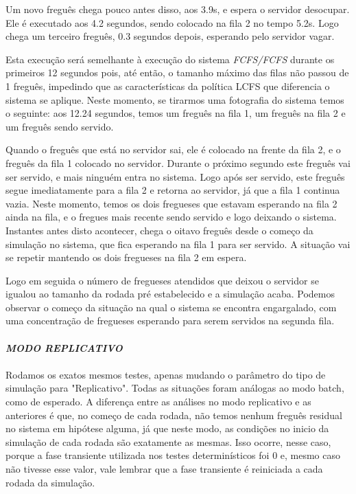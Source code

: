 \documentclass[a4paper,10pt]{article}
\begin{document}
    Um novo freguês chega pouco antes disso, aos 3.9s, e espera o servidor desocupar. Ele é executado aos 4.2 segundos, sendo colocado na fila 2 no tempo 5.2s. Logo chega um terceiro freguês, 0.3 segundos depois, esperando pelo servidor vagar.

    Esta execução será semelhante à execução do sistema \emph{FCFS/FCFS} durante os primeiros 12 segundos pois, até então, o tamanho máximo das filas não passou de 1 freguês, impedindo que as características da política LCFS que diferencia o sistema se aplique. Neste momento, se tirarmos uma fotografia do sistema temos o seguinte: aos 12.24 segundos, temos um freguês na fila 1, um freguês na fila 2 e um freguês sendo servido.

    Quando o freguês que está no servidor sai, ele é colocado na frente da fila 2, e o freguês da fila 1 colocado no servidor. Durante o próximo segundo este freguês vai ser servido, e mais ninguém entra no sistema. Logo após ser servido, este freguês segue imediatamente para a fila 2 e retorna ao servidor, já que a fila 1 continua vazia. Neste momento, temos os dois fregueses que estavam esperando na fila 2 ainda na fila, e o fregues mais recente sendo servido e logo deixando o sistema. Instantes antes disto acontecer, chega o oitavo freguês desde o começo da simulação no sistema, que fica esperando na fila 1 para ser servido. A situação vai se repetir mantendo os dois fregueses na fila 2 em espera.

    Logo em seguida o número de fregueses atendidos que deixou o servidor se igualou ao tamanho da rodada pré estabelecido e a simulação acaba. Podemos observar o começo da situação na qual o sistema se encontra engargalado, com uma concentração de fregueses esperando para serem servidos na segunda fila.
\\
\\
\textbf{\emph{MODO REPLICATIVO}}
\\
\\
    Rodamos os exatos mesmos testes, apenas mudando o parâmetro do tipo de simulação para "Replicativo". Todas as situações foram análogas ao modo batch, como de esperado. A diferença entre as análises no modo replicativo e as anteriores é que, no começo de cada rodada, não temos nenhum freguês residual no sistema em hipótese alguma, já que neste modo, as condições no inicio da simulação de cada rodada são exatamente as mesmas. Isso ocorre, nesse caso, porque a fase transiente utilizada nos testes determinísticos foi 0 e, mesmo caso não tivesse esse valor, vale lembrar que a fase transiente é reiniciada a cada rodada da simulação.
\end{document}
